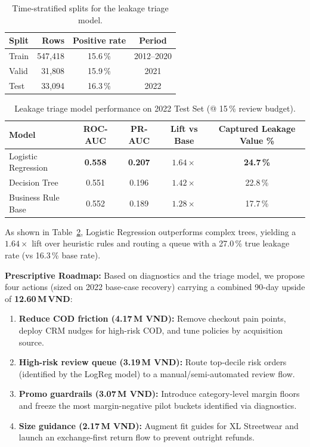 \documentclass[10pt]{article}
\begin{document}
\begin{table}[ht]
\centering
\caption{Time-stratified splits for the leakage triage model.}
\label{tab:splits}
\small
\setlength{\tabcolsep}{4pt}
\begin{tabular}{lrcc}
\toprule
\textbf{Split} & \textbf{Rows} & \textbf{Positive rate} & \textbf{Period}\\
\midrule
Train &  547{,}418 & 15.6\,\% & 2012--2020\\
Valid &   31{,}808 & 15.9\,\% & 2021\\
Test  &   33{,}094 & 16.3\,\% & 2022\\
\bottomrule
\end{tabular}
\end{table}

\begin{table}[ht]
\centering
\caption{Leakage triage model performance on 2022 Test Set (@ 15\,\% review budget).}
\label{tab:models}
\small
\setlength{\tabcolsep}{8pt}
\begin{tabular}{lcccc}
\toprule
\textbf{Model} & \textbf{ROC-AUC} & \textbf{PR-AUC} & \textbf{Lift vs Base} & \textbf{Captured Leakage Value \%}\\
\midrule
Logistic Regression & \textbf{0.558} & \textbf{0.207} & $\mathbf{1.64\times}$ & \textbf{24.7\,\%}\\
Decision Tree       & 0.551 & 0.196 & $1.42\times$ & 22.8\,\%\\
Business Rule Base  & 0.552 & 0.189 & $1.28\times$ & 17.7\,\%\\
\bottomrule
\end{tabular}
\end{table}

As shown in Table~\ref{tab:models}, Logistic Regression outperforms complex trees, yielding a $1.64\times$ lift over heuristic rules and routing a queue with a 27.0\,\% true leakage rate (vs 16.3\,\% base rate).

\textbf{Prescriptive Roadmap:} Based on diagnostics and the triage model, we propose four actions (sized on 2022 base-case recovery) carrying a combined 90-day upside of \textbf{12.60\,M\,VND}:
\begin{enumerate}
    \item \textbf{Reduce COD friction (4.17\,M VND):} Remove checkout pain points, deploy CRM nudges for high-risk COD, and tune policies by acquisition source.
    \item \textbf{High-risk review queue (3.19\,M VND):} Route top-decile risk orders (identified by the LogReg model) to a manual/semi-automated review flow.
    \item \textbf{Promo guardrails (3.07\,M VND):} Introduce category-level margin floors and freeze the most margin-negative pilot buckets identified via diagnostics.
    \item \textbf{Size guidance (2.17\,M VND):} Augment fit guides for XL Streetwear and launch an exchange-first return flow to prevent outright refunds.
\end{enumerate}
\end{document}
